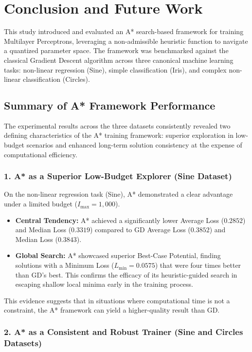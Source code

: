 \newpage
\section{Conclusion and Future Work}
\label{sec:conclusion}

\noindent This study introduced and evaluated an A* search-based framework for training Multilayer Perceptrons, leveraging a non-admissible heuristic function to navigate a quantized parameter space. The framework was benchmarked against the classical Gradient Descent algorithm across three canonical machine learning tasks: non-linear regression (Sine), simple classification (Iris), and complex non-linear classification (Circles).

\subsection{Summary of A* Framework Performance}
\label{sec:astar_summary}

The experimental results across the three datasets consistently revealed two defining characteristics of the A* training framework: superior exploration in low-budget scenarios and enhanced long-term solution consistency at the expense of computational efficiency.

\subsubsection*{1. A* as a Superior Low-Budget Explorer (Sine Dataset)}

On the non-linear regression task (Sine), A* demonstrated a clear advantage under a limited budget ($I_{\text{max}}=1,000$).
\begin{itemize}
    \item \textbf{Central Tendency:} A* achieved a significantly lower Average Loss ($0.2852$) and Median Loss ($0.3319$) compared to GD Average Loss ($0.3852$) and Median Loss ($0.3843$).
    \item \textbf{Global Search:} A* showcased superior Best-Case Potential, finding solutions with a Minimum Loss ($L_{\min} = 0.0575$) that were four times better than GD's best. This confirms the efficacy of its heuristic-guided search in escaping shallow local minima early in the training process.
\end{itemize}
This evidence suggests that in situations where computational time is not a constraint, the A* framework can yield a higher-quality result than GD.

\subsubsection*{2. A* as a Consistent and Robust Trainer (Sine and Circles Datasets)}

